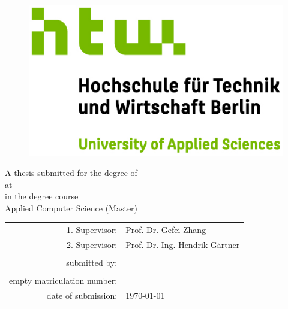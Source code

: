 \begin{titlepage}
		\begin{center}
		\begin{figure}[h]
			
				\hfill
				\begin{minipage}[hbt]{6cm}
				\includegraphics[scale=1.5]{images/htw_logo_rgb.jpg}
				
				\end{minipage}
			\end{figure}
			\vfill
			{\Large \textbf {\thesisTitle}\par}
			\vskip 0.5cm
			
			{\large A thesis submitted for the degree of\\ \bfseries \gradeType}
			\vskip 0.5cm
			{\large at}
			\vskip 0.5cm
			\large \universityName\\ 
			in the degree course\\
			Applied Computer Science (Master)\\
			\vfill
			\begin{flushleft}
				\begin{tabular}[t]{rl}
					1. Supervisor: &Prof. Dr. Gefei Zhang\\
					2. Supervisor: &Prof. Dr.-Ing. Hendrik Gärtner\\
					\\
					submitted by: &\thesisAuthor\\
					\ifx\\empty
					\else
					matriculation number: & \matrNumber\\
					\fi
					date of submission: & \today
				\end{tabular}
			\end{flushleft}
		\end{center}
		\restoregeometry
	\end{titlepage}


